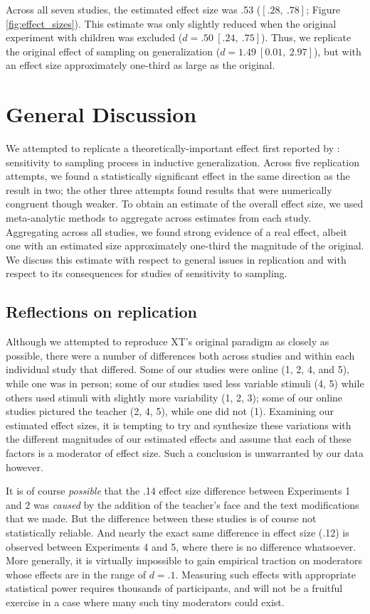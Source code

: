 \documentclass[man]{apa2}
\begin{document}
Across all seven studies, the estimated effect size was .53 ($[.28,\ .78]$; Figure \ref{fig:effect_sizes}). This estimate was only slightly reduced when the original experiment with children was excluded  ($d = .50\ [.24,\ .75]$). Thus, we replicate the original effect of sampling on generalization ($d = 1.49\ [0.01,\ 2.97]$), but with an effect size approximately one-third as large as the original.

\section{General Discussion}

We attempted to replicate a theoretically-important effect first reported by : sensitivity to sampling process in inductive generalization. Across five replication attempts, we found a statistically significant effect in the same direction as the result in two; the other three attempts found results that were numerically congruent though weaker. To obtain an estimate of the overall effect size, we used meta-analytic methods to aggregate across estimates from each study. Aggregating across all studies, we found strong evidence of a real effect, albeit one with an estimated size approximately one-third the magnitude of the original. We discuss this estimate with respect to general issues in replication and with respect to its consequences for studies of sensitivity to sampling. 

\subsection{Reflections on replication}

Although we attempted to reproduce XT's original paradigm as closely as possible, there were a number of differences both across studies and within each individual study that differed. Some of our studies were online (1, 2, 4, and 5), while one was in person; some of our studies used less variable stimuli (4, 5) while others used stimuli with slightly more variability (1, 2, 3); some of our online studies pictured the teacher (2, 4, 5), while one did not (1). Examining our estimated effect sizes, it is tempting to try and synthesize these variations with the different magnitudes of our estimated effects and assume that each of these factors is a moderator of effect size. Such a conclusion is unwarranted by our data however. 

It is of course \emph{possible} that the .14 effect size difference between Experiments 1 and 2 was \emph{caused} by the addition of the teacher's face and the text modifications that we made. But the difference between these studies is of course not statistically reliable. And nearly the exact same difference in effect size (.12) is observed between Experiments 4 and 5, where there is no difference whatsoever. More generally, it is virtually impossible to gain empirical traction on moderators whose effects are in the range of $d = .1$. Measuring such effects with appropriate statistical power requires thousands of participants, and will not be a fruitful exercise in a case where many such tiny moderators could exist. 
\end{document}
